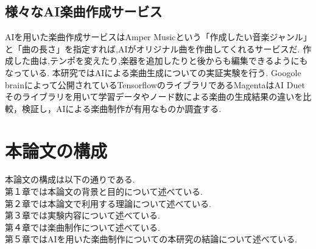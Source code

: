 \subsection{様々なAI楽曲作成サービス}
AIを用いた楽曲作成サービスはAmper Musicという「作成したい音楽ジャンル」と「曲の長さ」を指定すれば,AIがオリジナル曲を作曲してくれるサービスだ.
作成した曲は,テンポを変えたり,楽器を追加したりと後からも編集できるようにもなっている.
本研究ではAIによる楽曲生成についての実証実験を行う.
Googole brainによって公開されているTensorflowのライブラリであるMagentaはAI Duet
そのライブラリを用いて学習データやノード数による楽曲の生成結果の違いを比較，検証し，AIによる楽曲制作が有用なものか調査する.
\section{本論文の構成}
本論文の構成は以下の通りである.\\
第１章では本論文の背景と目的について述べている.\\
第２章では本論文で利用する理論について述べている.\\
第３章では実験内容について述べている.\\
第４章では楽曲制作について述べている.\\
第５章ではAIを用いた楽曲制作についての本研究の結論について述べている.\\